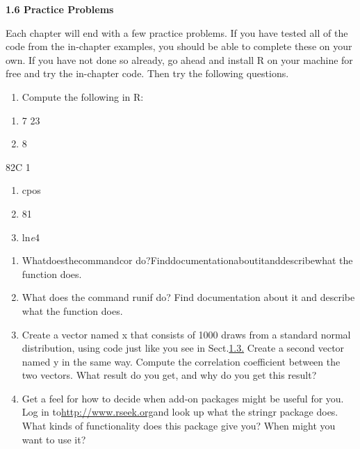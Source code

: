 \documentclass[
]{book}
\providecommand{\tightlist}{%
  \setlength{\itemsep}{0pt}\setlength{\parskip}{0pt}}
\begin{document}
\textbf{1.6 Practice Problems}

Each chapter will end with a few practice problems. If you have tested all of the code from the in-chapter examples, you should be able to complete these on your own. If you have not done so already, go ahead and install R on your machine for free and try the in-chapter code. Then try the following questions.

\begin{enumerate}
\def\labelenumi{\arabic{enumi}.}
\tightlist
\item
  Compute the following in R:
\end{enumerate}

\begin{enumerate}
\def\labelenumi{\arabic{enumi})}
\tightlist
\item
  7 23
\item
  8
\end{enumerate}

82C 1

\begin{enumerate}
\def\labelenumi{\arabic{enumi})}
\setcounter{enumi}{2}
\tightlist
\item
  cpos
\item
  81
\item
  ln\emph{e}4
\end{enumerate}

\begin{enumerate}
\def\labelenumi{\arabic{enumi}.}
\setcounter{enumi}{1}
\tightlist
\item
  Whatdoesthecommandcor do?Finddocumentationaboutitanddescribewhat the function does.
\item
  What does the command runif do? Find documentation about it and describe what the function does.
\item
  Create a vector named x that consists of 1000 draws from a standard normal distribution, using code just like you see in Sect.\protect\hyperlink{_page6_x53.00_y53.15}{1.3.} Create a second vector named y in the same way. Compute the correlation coefficient between the two vectors. What result do you get, and why do you get this result?
\item
  Get a feel for how to decide when add-on packages might be useful for you. Log in to\url{http://www.rseek.org}and look up what the stringr package does. What kinds of functionality does this package give you? When might you want to use it?
\end{enumerate}
\end{document}
